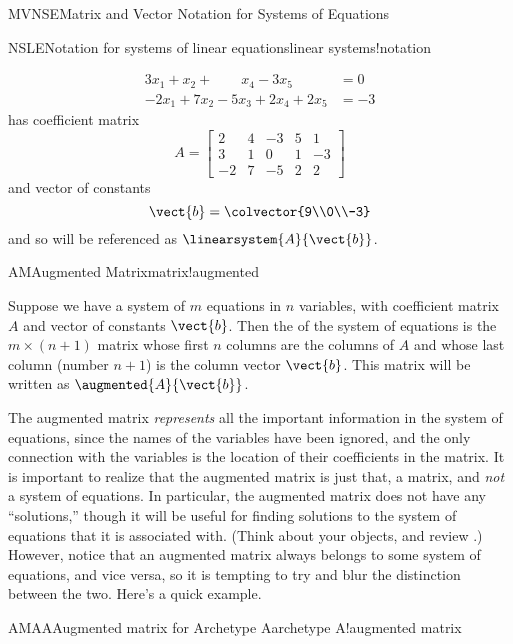 \begin{subsect}{MVNSE}{Matrix and Vector Notation for Systems of Equations}
\begin{example}{NSLE}{Notation for systems of linear equations}{linear systems!notation}
\begin{para}
\begin{align*}
3x_1+x_2+\quad\quad x_4-3x_5&=0\\
-2x_1+7x_2-5x_3+2x_4+2x_5&=-3
\end{align*}
%
has coefficient matrix
%
\begin{equation*}
A=
\begin{bmatrix}
2 & 4 & -3 & 5 & 1\\
3 & 1 & 0 & 1 & -3\\
-2 & 7 & -5 & 2 & 2
\end{bmatrix}
\end{equation*}
%
and vector of constants
%
\begin{equation*}
\vect{b}=\colvector{9\\0\\-3}
\end{equation*}
%
and so will be referenced as $\linearsystem{A}{\vect{b}}$.\end{para}
%
\end{example}
%
\begin{definition}{AM}{Augmented Matrix}{matrix!augmented}
\begin{para}Suppose we have a system of $m$ equations in $n$ variables, with coefficient matrix $A$ and vector of constants $\vect{b}$.  Then the  of the system of equations is the $m\times(n+1)$ matrix whose first $n$ columns are the columns of $A$ and whose last column (number $n+1$) is the column vector $\vect{b}$.  This matrix will be written as $\augmented{A}{\vect{b}}$.\end{para}
\end{definition}
%
\begin{para}The augmented matrix {\em represents} all the important information in the system of equations, since the names of the variables have been ignored, and the only connection with the variables is the location of their coefficients in the matrix.  It is important to realize that the augmented matrix is just that, a matrix, and {\em not} a system of equations.  In particular, the augmented matrix does not have any ``solutions,'' though it will be useful for finding solutions to the system of equations that it is associated with.  (Think about your objects, and review .)  However, notice that an augmented matrix always belongs to some system of equations, and vice versa, so it is tempting to try and blur the distinction between the two.  Here's a quick example.\end{para}
%
\begin{example}{AMAA}{Augmented matrix for Archetype A}{archetype A!augmented matrix}

\end{example}
\end{subsect}
